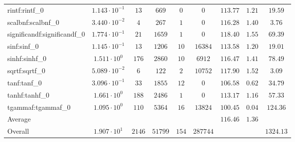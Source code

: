 \begin{tabular}{|l|c|c|c|c|c|c|c|c|}
rintf:rintf\_0               & $ 1.143 \cdot 10^{-1} $ & $ 13     $ & $ 669   $ & $ 0   $ & $ 0      $ & $ 113.77      $ & $ 1.21    $ & $ 19.59   $ \\
scalbnf:scalbnf\_0           & $ 3.440 \cdot 10^{-2} $ & $ 4      $ & $ 267   $ & $ 1   $ & $ 0      $ & $ 116.28      $ & $ 1.40    $ & $ 3.76    $ \\
significandf:significandf\_0 & $ 1.774 \cdot 10^{-1} $ & $ 21     $ & $ 1659  $ & $ 1   $ & $ 0      $ & $ 118.40      $ & $ 1.55    $ & $ 69.39   $ \\
sinf:sinf\_0                 & $ 1.145 \cdot 10^{-1} $ & $ 13     $ & $ 1206  $ & $ 10  $ & $ 16384  $ & $ 113.58      $ & $ 1.20    $ & $ 19.01   $ \\
sinhf:sinhf\_0               & $ 1.511 \cdot 10^{0}  $ & $ 176    $ & $ 2860  $ & $ 10  $ & $ 6912   $ & $ 116.47      $ & $ 1.41    $ & $ 78.49   $ \\
sqrtf:sqrtf\_0               & $ 5.089 \cdot 10^{-2} $ & $ 6      $ & $ 122   $ & $ 2   $ & $ 10752  $ & $ 117.90      $ & $ 1.52    $ & $ 3.09    $ \\
tanf:tanf\_0                 & $ 3.096 \cdot 10^{-1} $ & $ 33     $ & $ 1855  $ & $ 12  $ & $ 0      $ & $ 106.58      $ & $ 0.62    $ & $ 34.79   $ \\
tanhf:tanhf\_0               & $ 1.661 \cdot 10^{0}  $ & $ 188    $ & $ 2486  $ & $ 1   $ & $ 0      $ & $ 113.17      $ & $ 1.16    $ & $ 57.33   $ \\
tgammaf:tgammaf\_0           & $ 1.095 \cdot 10^{0}  $ & $ 110    $ & $ 5364  $ & $ 16  $ & $ 13824  $ & $ 100.45      $ & $ 0.04    $ & $ 124.36  $ \\
\hline
Average                      & $                     $ & $        $ & $       $ & $     $ & $        $ & $ 116.46      $ & $ 1.36    $ & $         $ \\
\hline
Overall                      & $ 1.907 \cdot 10^{1}  $ & $ 2146   $ & $ 51799 $ & $ 154 $ & $ 287744 $ & $             $ & $         $ & $ 1324.13 $ \\
\hline
\end{tabular}
